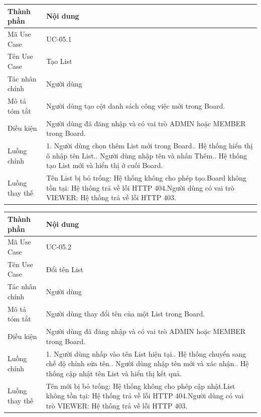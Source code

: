 \vspace{0.3cm}
\noindent\begin{tabular}{|p{3.5cm}|p{10.5cm}|}
\hline
\textbf{Thành phần} & \textbf{Nội dung} \\
\hline
Mã Use Case & UC-05.1 \\
\hline
Tên Use Case & Tạo List \\
\hline
Tác nhân chính & Người dùng \\
\hline
Mô tả tóm tắt & Người dùng tạo cột danh sách công việc mới trong Board. \\
\hline
Điều kiện & Người dùng đã đăng nhập và có vai trò ADMIN hoặc MEMBER trong Board. \\
\hline
Luồng chính & 1. Người dùng chọn thêm List mới trong Board.\newline 2. Hệ thống hiển thị ô nhập tên List.\newline 3. Người dùng nhập tên và nhấn Thêm.\newline 4. Hệ thống tạo List mới và hiển thị ở cuối Board. \\
\hline
Luồng thay thế & Tên List bị bỏ trống: Hệ thống không cho phép tạo.\newline Board không tồn tại: Hệ thống trả về lỗi HTTP 404.\newline Người dùng có vai trò VIEWER: Hệ thống trả về lỗi HTTP 403. \\
\hline
\end{tabular}

\vspace{0.5cm}
\noindent\begin{tabular}{|p{3.5cm}|p{10.5cm}|}
\hline
\textbf{Thành phần} & \textbf{Nội dung} \\
\hline
Mã Use Case & UC-05.2 \\
\hline
Tên Use Case & Đổi tên List \\
\hline
Tác nhân chính & Người dùng \\
\hline
Mô tả tóm tắt & Người dùng thay đổi tên của một List trong Board. \\
\hline
Điều kiện & Người dùng đã đăng nhập và có vai trò ADMIN hoặc MEMBER trong Board. \\
\hline
Luồng chính & 1. Người dùng nhấp vào tên List hiện tại.\newline 2. Hệ thống chuyển sang chế độ chỉnh sửa tên.\newline 3. Người dùng nhập tên mới và xác nhận.\newline 4. Hệ thống cập nhật tên List và hiển thị kết quả. \\
\hline
Luồng thay thế & Tên mới bị bỏ trống: Hệ thống không cho phép cập nhật.\newline List không tồn tại: Hệ thống trả về lỗi HTTP 404.\newline Người dùng có vai trò VIEWER: Hệ thống trả về lỗi HTTP 403. \\
\hline
\end{tabular}

